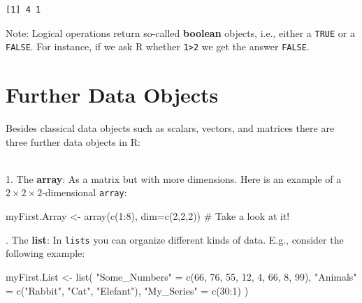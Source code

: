\documentclass[
  letterpaper,
  DIV=11,
  numbers=noendperiod]{scrreprt}
\newenvironment{Shaded}{\begin{snugshade}}{\end{snugshade}}
\newcommand{\AttributeTok}[1]{\textcolor[rgb]{0.40,0.45,0.13}{#1}}
\newcommand{\CommentTok}[1]{\textcolor[rgb]{0.37,0.37,0.37}{#1}}
\newcommand{\DecValTok}[1]{\textcolor[rgb]{0.68,0.00,0.00}{#1}}
\newcommand{\FunctionTok}[1]{\textcolor[rgb]{0.28,0.35,0.67}{#1}}
\newcommand{\NormalTok}[1]{\textcolor[rgb]{0.00,0.23,0.31}{#1}}
\newcommand{\OtherTok}[1]{\textcolor[rgb]{0.00,0.23,0.31}{#1}}
\newcommand{\SpecialCharTok}[1]{\textcolor[rgb]{0.37,0.37,0.37}{#1}}
\newcommand{\StringTok}[1]{\textcolor[rgb]{0.13,0.47,0.30}{#1}}
\theoremstyle{definition}
\theoremstyle{plain}
\theoremstyle{plain}
\theoremstyle{remark}
\begin{document}
\begin{verbatim}
[1] 4 1
\end{verbatim}

Note: Logical operations return so-called \textbf{boolean} objects,
i.e., either a \texttt{TRUE} or a \texttt{FALSE}. For instance, if we
ask R whether \texttt{1\textgreater{}2} we get the answer
\texttt{FALSE}.

\hypertarget{further-data-objects}{%
\section{Further Data Objects}\label{further-data-objects}}

Besides classical data objects such as scalars, vectors, and matrices
there are three further data objects in R:\\
\strut \\
1. The \textbf{array}: As a matrix but with more dimensions. Here is an
example of a \(2\times 2\times 2\)-dimensional \texttt{array}:

\begin{Shaded}
\begin{Highlighting}[]
\NormalTok{myFirst.Array }\OtherTok{\textless{}{-}} \FunctionTok{array}\NormalTok{(}\FunctionTok{c}\NormalTok{(}\DecValTok{1}\SpecialCharTok{:}\DecValTok{8}\NormalTok{), }\AttributeTok{dim=}\FunctionTok{c}\NormalTok{(}\DecValTok{2}\NormalTok{,}\DecValTok{2}\NormalTok{,}\DecValTok{2}\NormalTok{)) }\CommentTok{\# Take a look at it!}
\end{Highlighting}
\end{Shaded}

\hfill\break
\hfill{}. The \textbf{list}: In \texttt{lists} you can organize different kinds
of data. E.g., consider the following example:

\begin{Shaded}
\begin{Highlighting}[]
\NormalTok{myFirst.List }\OtherTok{\textless{}{-}} \FunctionTok{list}\NormalTok{(}
  \StringTok{"Some\_Numbers"} \OtherTok{=} \FunctionTok{c}\NormalTok{(}\DecValTok{66}\NormalTok{, }\DecValTok{76}\NormalTok{, }\DecValTok{55}\NormalTok{, }\DecValTok{12}\NormalTok{, }\DecValTok{4}\NormalTok{, }\DecValTok{66}\NormalTok{, }\DecValTok{8}\NormalTok{, }\DecValTok{99}\NormalTok{), }
  \StringTok{"Animals"}      \OtherTok{=} \FunctionTok{c}\NormalTok{(}\StringTok{"Rabbit"}\NormalTok{, }\StringTok{"Cat"}\NormalTok{, }\StringTok{"Elefant"}\NormalTok{),}
  \StringTok{"My\_Series"}    \OtherTok{=} \FunctionTok{c}\NormalTok{(}\DecValTok{30}\SpecialCharTok{:}\DecValTok{1}\NormalTok{)}
\NormalTok{) }
\end{Highlighting}
\end{Shaded}
\end{document}
